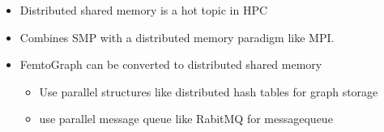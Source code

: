 \documentclass[25pt, portrait,  margin=0mm, innermargin=15mm,
  blockverticalspace=15mm, colspace=15mm, subcolspace=8mm]{tikzposter}
\begin{document}
\begin{columns}
{    }

     {
      \begin{itemize}
      \item Distributed shared memory is a hot topic in HPC
      \item Combines SMP with a distributed memory paradigm like MPI.
      \item FemtoGraph can be converted to distributed shared memory
        \begin{itemize}
        \item Use parallel structures like distributed hash tables for graph storage
        \item use parallel message queue like RabitMQ for messagequeue
        \end{itemize}
      \end{itemize}
    }



\end{columns}
\end{document}
